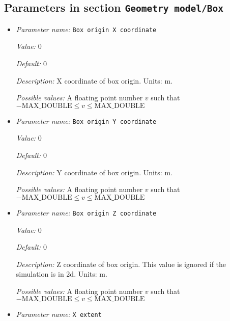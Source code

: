 \subsection{Parameters in section \tt Geometry model/Box}
\label{parameters:Geometry_20model/Box}

\begin{itemize}
\item {\it Parameter name:} {\tt Box origin X coordinate}
\label{parameters:Geometry model/Box/Box origin X coordinate}
\label{parameters:Geometry_20model/Box/Box_20origin_20X_20coordinate}


{\it Value:} 0


{\it Default:} 0


{\it Description:} X coordinate of box origin. Units: m.


{\it Possible values:} A floating point number $v$ such that $-\text{MAX\_DOUBLE} \leq v \leq \text{MAX\_DOUBLE}$
\item {\it Parameter name:} {\tt Box origin Y coordinate}
\label{parameters:Geometry model/Box/Box origin Y coordinate}
\label{parameters:Geometry_20model/Box/Box_20origin_20Y_20coordinate}


{\it Value:} 0


{\it Default:} 0


{\it Description:} Y coordinate of box origin. Units: m.


{\it Possible values:} A floating point number $v$ such that $-\text{MAX\_DOUBLE} \leq v \leq \text{MAX\_DOUBLE}$
\item {\it Parameter name:} {\tt Box origin Z coordinate}
\label{parameters:Geometry model/Box/Box origin Z coordinate}
\label{parameters:Geometry_20model/Box/Box_20origin_20Z_20coordinate}


{\it Value:} 0


{\it Default:} 0


{\it Description:} Z coordinate of box origin. This value is ignored if the simulation is in 2d. Units: m.


{\it Possible values:} A floating point number $v$ such that $-\text{MAX\_DOUBLE} \leq v \leq \text{MAX\_DOUBLE}$
\item {\it Parameter name:} {\tt X extent}
\label{parameters:Geometry model/Box/X extent}
\label{parameters:Geometry_20model/Box/X_20extent}



\end{itemize}
